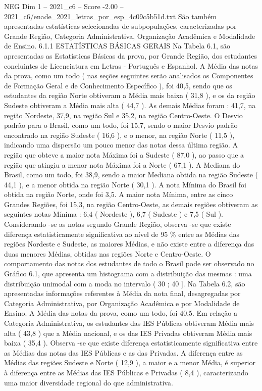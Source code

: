 \begin{textsample}{NEG Dim 1 – 2021\_c6 – Score -2.00 – 2021\_c6/enade\_2021\_letras\_por\_esp\_4c09c5b51d.txt}
São também apresentadas estatísticas selecionadas de subpopulações, caracterizadas por Grande Região, Categoria Administrativa, Organização Acadêmica e Modalidade de Ensino. 6.1.1 ESTATÍSTICAS BÁSICAS GERAIS Na Tabela 6.1, são apresentadas as Estatísticas Básicas da prova, por Grande Região, dos estudantes concluintes de Licenciatura em Letras - Português e Espanhol.
A Média das notas da prova, como um todo ( nas seções seguintes serão analisados os Componentes de Formação Geral e de Conhecimento Específico ), foi 40,5, sendo que os estudantes da região Norte obtiveram a Média mais baixa ( 31,8 ), e os da região Sudeste obtiveram a Média mais alta ( 44,7 ).
As demais Médias foram : 41,7, na região Nordeste, 37,9, na região Sul e 35,2, na região Centro-Oeste.
O Desvio padrão para o Brasil, como um todo, foi 15,7, sendo o maior Desvio padrão encontrado na região Sudeste ( 16,6 ), e o menor, na região Norte ( 11,5 ), indicando uma dispersão um pouco menor das notas dessa última região.
A região que obteve a maior nota Máxima foi a Sudeste ( 87,0 ), ao passo que a região que atingiu a menor nota Máxima foi a Norte ( 67,1 ).
A Mediana do Brasil, como um todo, foi 38,9, sendo a maior Mediana obtida na região Sudeste ( 44,1 ), e a menor obtida na região Norte ( 30,1 ).
A nota Mínima do Brasil foi obtida na região Norte, onde foi 3,5.
A maior nota Mínima, entre as cinco Grandes Regiões, foi 15,3, na região Centro-Oeste, as demais regiões obtiveram as seguintes notas Mínima : 6,4 ( Nordeste ), 6,7 ( Sudeste ) e 7,5 ( Sul ).
Considerando -se as notas segundo Grande Região, observa -se que existe diferença estatisticamente significativa ao nível de 95 \% entre as Médias das regiões Nordeste e Sudeste, as maiores Médias, e não existe entre a diferença das duas menores Médias, obtidas nas regiões Norte e Centro-Oeste.
O comportamento das notas dos estudantes de todo o Brasil pode ser observado no Gráfico 6.1, que apresenta um histograma com a distribuição das mesmas : uma distribuição unimodal com a moda no intervalo ( 30 ; 40 ].
Na Tabela 6.2, são apresentadas informações referentes à Média da nota final, desagregadas por Categoria Administrativa, por Organização Acadêmica e por Modalidade de Ensino.
A Média das notas da prova, como um todo, foi 40,5.
Em relação a Categoria Administrativa, os estudantes das IES Públicas obtiveram Média mais alta ( 43,8 ) que a Média nacional, e os das IES Privadas obtiveram Média mais baixa ( 35,4 ).
Observa -se que existe diferença estatisticamente significativa entre as Médias das notas das IES Públicas e as das Privadas.
A diferença entre as Médias das regiões Sudeste e Norte ( 12,9 ), a maior e a menor Média, é superior à diferença entre as Médias das IES Públicas e Privadas ( 8,4 ), caracterizando uma maior diversidade regional do que administrativa.

\end{textsample}
